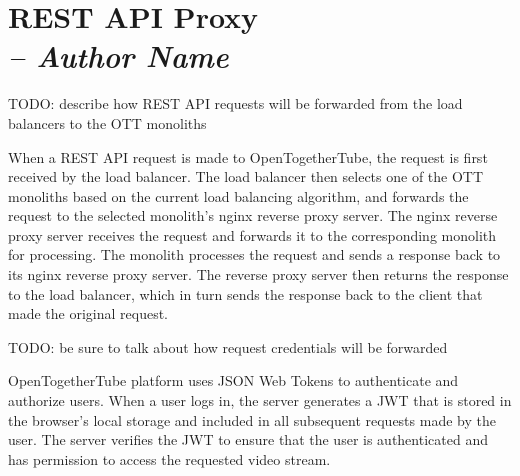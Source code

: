 \chapter{REST API Proxy \\
  \small{\textit{-- Author Name}}
  \label{Chapter::RestApiProxy}}


TODO: describe how REST API requests will be forwarded from the load balancers to the OTT monoliths

When a REST API request is made to OpenTogetherTube, the request is first received by the load balancer. The 
load balancer then selects one of the OTT monoliths based on the current load balancing algorithm, and forwards the 
request to the selected monolith's nginx reverse proxy server. The nginx reverse proxy server receives the request and 
forwards it to the corresponding monolith for processing. 
The monolith processes the request and sends a response back to its nginx reverse proxy server. The reverse proxy server 
then returns the response to the load balancer, which in turn sends the response back to the client that made the original
request.

TODO: be sure to talk about how request credentials will be forwarded

OpenTogetherTube platform uses JSON Web Tokens to authenticate and authorize users. When a user logs in, the 
server generates a JWT that is stored in the browser's local storage and included in all subsequent requests made
by the user. The server verifies the JWT to ensure that the user is authenticated and has permission to access the 
requested video stream.
